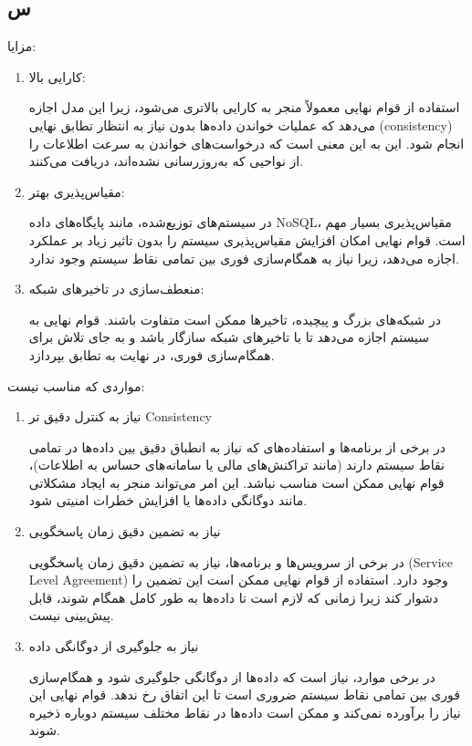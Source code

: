 \subsection*{س}
مزایا:
\begin{enumerate}
\item  کارایی بالا:
	
	استفاده از قوام نهایی معمولاً منجر به کارایی بالاتری می‌شود، زیرا این مدل اجازه می‌دهد که عملیات خواندن داده‌ها بدون نیاز به انتظار تطابق نهایی (consistency) انجام شود. این به این معنی است که درخواست‌های خواندن به سرعت اطلاعات را از نواحیی که به‌روزرسانی نشده‌اند، دریافت می‌کنند.
\item  مقیاس‌پذیری بهتر:
	
	در سیستم‌های توزیع‌شده، مانند پایگاه‌های داده NoSQL، مقیاس‌پذیری بسیار مهم است. قوام نهایی امکان افزایش مقیاس‌پذیری سیستم را بدون تاثیر زیاد بر عملکرد اجازه می‌دهد، زیرا نیاز به همگام‌سازی فوری بین تمامی نقاط سیستم وجود ندارد.
\item  منعطف‌سازی در تاخیرهای شبکه:
	
	در شبکه‌های بزرگ و پیچیده، تاخیرها ممکن است متفاوت باشند. قوام نهایی به سیستم اجازه می‌دهد تا با تاخیرهای شبکه سازگار باشد و به جای تلاش برای همگام‌سازی فوری، در نهایت به تطابق بپردازد.
\end{enumerate}
\pagebreak
مواردی که مناسب نیست:
\begin{enumerate}
\item  نیاز به کنترل دقیق تر Consistency
	
	در برخی از برنامه‌ها و استفاده‌های که نیاز به انطباق دقیق بین داده‌ها در تمامی نقاط سیستم دارند (مانند تراکنش‌های مالی یا سامانه‌های حساس به اطلاعات)، قوام نهایی ممکن است مناسب نباشد. این امر می‌تواند منجر به ایجاد مشکلاتی مانند دوگانگی داده‌ها یا افزایش خطرات امنیتی شود.
\item  نیاز به تضمین دقیق زمان پاسخگویی
	
	در برخی از سرویس‌ها و برنامه‌ها، نیاز به تضمین دقیق زمان پاسخگویی (Service Level Agreement) وجود دارد. استفاده از قوام نهایی ممکن است این تضمین را دشوار کند زیرا زمانی که لازم است تا داده‌ها به طور کامل همگام شوند، قابل پیش‌بینی نیست.
\item  نیاز به جلوگیری از دوگانگی داده
	
	در برخی موارد، نیاز است که داده‌ها از دوگانگی جلوگیری شود و همگام‌سازی فوری بین تمامی نقاط سیستم ضروری است تا این اتفاق رخ ندهد. قوام نهایی این نیاز را برآورده نمی‌کند و ممکن است داده‌ها در نقاط مختلف سیستم دوباره ذخیره شوند.
\end{enumerate}



